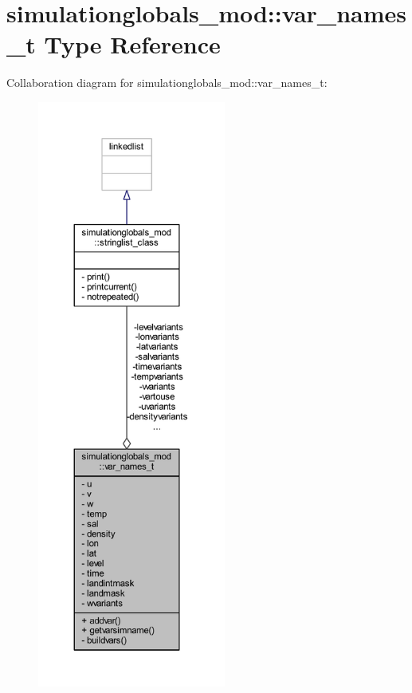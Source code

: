 \hypertarget{structsimulationglobals__mod_1_1var__names__t}{}\section{simulationglobals\+\_\+mod\+:\+:var\+\_\+names\+\_\+t Type Reference}
\label{structsimulationglobals__mod_1_1var__names__t}


Collaboration diagram for simulationglobals\+\_\+mod\+:\+:var\+\_\+names\+\_\+t\+:\nopagebreak
\begin{figure}[H]
\begin{center}
\leavevmode
\includegraphics[height=550pt]{structsimulationglobals__mod_1_1var__names__t__coll__graph}
\end{center}
\end{figure}

